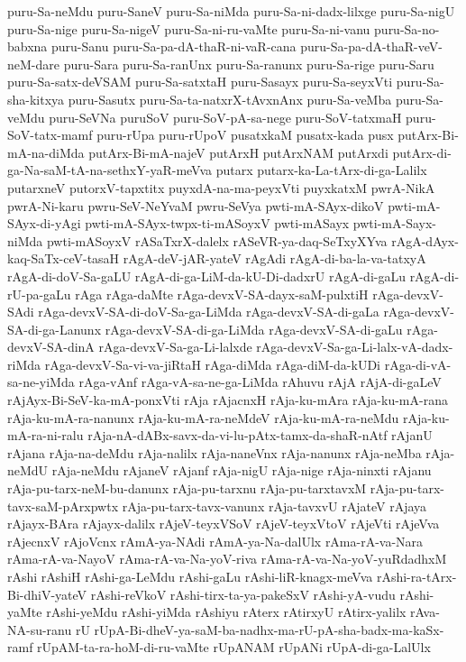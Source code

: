 {puru-Sa-neMdu
puru-SaneV
puru-Sa-niMda
puru-Sa-ni-dadx-lilxge
puru-Sa-nigU
puru-Sa-nige
puru-Sa-nigeV
puru-Sa-ni-ru-vaMte
puru-Sa-ni-vanu
puru-Sa-no-babxna
puru-Sanu
puru-Sa-pa-dA-thaR-ni-vaR-cana
puru-Sa-pa-dA-thaR-veV-neM-dare
puru-Sara
puru-Sa-ranUnx
puru-Sa-ranunx
puru-Sa-rige
puru-Saru
puru-Sa-satx-deVSAM
puru-Sa-satxtaH
puru-Sasayx
puru-Sa-seyxVti
puru-Sa-sha-kitxya
puru-Sasutx
puru-Sa-ta-natxrX-tAvxnAnx
puru-Sa-veMba
puru-Sa-veMdu
puru-SeVNa
puruSoV
puru-SoV-pA-sa-nege
puru-SoV-tatxmaH
puru-SoV-tatx-mamf
puru-rUpa
puru-rUpoV
pusatxkaM
pusatx-kada
pusx
putArx-Bi-mA-na-diMda
putArx-Bi-mA-najeV
putArxH
putArxNAM
putArxdi
putArx-di-ga-Na-saM-tA-na-sethxY-yaR-meVva
putarx
putarx-ka-La-tArx-di-ga-Lalilx
putarxneV
putorxV-tapxtitx
puyxdA-na-ma-peyxVti
puyxkatxM
pwrA-NikA
pwrA-Ni-karu
pwru-SeV-NeYvaM
pwru-SeVya
pwti-mA-SAyx-dikoV
pwti-mA-SAyx-di-yAgi
pwti-mA-SAyx-twpx-ti-mASoyxV
pwti-mASayx
pwti-mA-Sayx-niMda
pwti-mASoyxV
rASaTxrX-dalelx
rASeVR-ya-daq-SeTxyXYva
rAgA-dAyx-kaq-SaTx-ceV-tasaH
rAgA-deV-jAR-yateV
rAgAdi
rAgA-di-ba-la-va-tatxyA
rAgA-di-doV-Sa-gaLU
rAgA-di-ga-LiM-da-kU-Di-dadxrU
rAgA-di-gaLu
rAgA-di-rU-pa-gaLu
rAga
rAga-daMte
rAga-devxV-SA-dayx-saM-pulxtiH
rAga-devxV-SAdi
rAga-devxV-SA-di-doV-Sa-ga-LiMda
rAga-devxV-SA-di-gaLa
rAga-devxV-SA-di-ga-Lanunx
rAga-devxV-SA-di-ga-LiMda
rAga-devxV-SA-di-gaLu
rAga-devxV-SA-dinA
rAga-devxV-Sa-ga-Li-lalxde
rAga-devxV-Sa-ga-Li-lalx-vA-dadx-riMda
rAga-devxV-Sa-vi-va-jiRtaH
rAga-diMda
rAga-diM-da-kUDi
rAga-di-vA-sa-ne-yiMda
rAga-vAnf
rAga-vA-sa-ne-ga-LiMda
rAhuvu
rAjA
rAjA-di-gaLeV
rAjAyx-Bi-SeV-ka-mA-ponxVti
rAja
rAjacnxH
rAja-ku-mAra
rAja-ku-mA-rana
rAja-ku-mA-ra-nanunx
rAja-ku-mA-ra-neMdeV
rAja-ku-mA-ra-neMdu
rAja-ku-mA-ra-ni-ralu
rAja-nA-dABx-savx-da-vi-lu-pAtx-tamx-da-shaR-nAtf
rAjanU
rAjana
rAja-na-deMdu
rAja-nalilx
rAja-naneVnx
rAja-nanunx
rAja-neMba
rAja-neMdU
rAja-neMdu
rAjaneV
rAjanf
rAja-nigU
rAja-nige
rAja-ninxti
rAjanu
rAja-pu-tarx-neM-bu-danunx
rAja-pu-tarxnu
rAja-pu-tarxtavxM
rAja-pu-tarx-tavx-saM-pArxpwtx
rAja-pu-tarx-tavx-vanunx
rAja-tavxvU
rAjateV
rAjaya
rAjayx-BAra
rAjayx-dalilx
rAjeV-teyxVSoV
rAjeV-teyxVtoV
rAjeVti
rAjeVva
rAjecnxV
rAjoVcnx
rAmA-ya-NAdi
rAmA-ya-Na-dalUlx
rAma-rA-va-Nara
rAma-rA-va-NayoV
rAma-rA-va-Na-yoV-riva
rAma-rA-va-Na-yoV-yuRdadhxM
rAshi
rAshiH
rAshi-ga-LeMdu
rAshi-gaLu
rAshi-liR-knagx-meVva
rAshi-ra-tArx-Bi-dhiV-yateV
rAshi-reVkoV
rAshi-tirx-ta-ya-pakeSxV
rAshi-yA-vudu
rAshi-yaMte
rAshi-yeMdu
rAshi-yiMda
rAshiyu
rAterx
rAtirxyU
rAtirx-yalilx
rAva-NA-su-ranu
rU
rUpA-Bi-dheV-ya-saM-ba-nadhx-ma-rU-pA-sha-badx-ma-kaSx-ramf
rUpAM-ta-ra-hoM-di-ru-vaMte
rUpANAM
rUpANi
rUpA-di-ga-LalUlx
}
